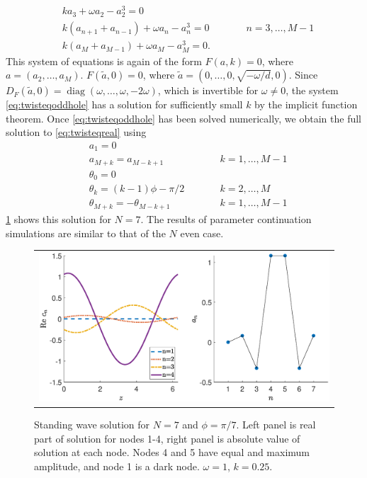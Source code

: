 \documentclass[12pt,reqno]{amsart}
\DeclareMathOperator{\diag}{diag}
\begin{document}
\begin{equation}\label{eq:twisteqoddhole}
\begin{aligned}
& k a_3 + \omega a_2 - a_2^3 = 0\\
&k( a_{n+1} + a_{n-1} ) + \omega a_n - a_n^3 = 0 && \qquad n = 3, \dots, M-1 \\
&k ( a_M + a_{M-1} ) + \omega a_M - a_M^3 = 0.
\end{aligned}
\end{equation}
This system of equations is again of the form $F(a,k) = 0$, where $a = (a_2, \dots, a_M)$. $F(\tilde{a}, 0) = 0$, where $\tilde{a} = (0, \dots, 0, \sqrt{-\omega/d}, 0)$. Since $D_F(\tilde{a}, 0) = \diag(\omega, \dots, \omega, -2\omega)$, which is invertible for $\omega \neq 0$, the system \cref{eq:twisteqoddhole} has a solution for sufficiently small $k$ by the implicit function theorem. Once \cref{eq:twisteqoddhole} has been solved numerically, we obtain the full solution to \cref{eq:twisteqreal} using
\begin{align*}
&a_1 = 0 \\
&a_{M+k} = a_{M-k+1} && \qquad k = 1, \dots, M-1 \\
&\theta_0 = 0 \\
&\theta_k = (k-1)\phi - \pi/2 && \qquad k = 2, \dots, M \\
&\theta_{M+k} = -\theta_{M-k+1} && \qquad k = 1, \dots, M-1
\end{align*}
\cref{fig:oddhole7} shows this solution for $N=7$. The results of parameter continuation simulations are similar to that of the $N$ even case.
\begin{figure}[H]
\begin{center}
\begin{tabular}{c}
\includegraphics[width=15cm]{images/oddhole7.eps}
\end{tabular}
\end{center}
\caption{Standing wave solution for $N = 7$ and $\phi = \pi/7$. Left panel is real part of solution for nodes 1-4, right panel is absolute value of solution at each node. Nodes 4 and 5 have equal and maximum amplitude, and node 1 is a dark node. $\omega = 1$, $k = 0.25$.}
\label{fig:oddhole7}
\end{figure}
\end{document}
